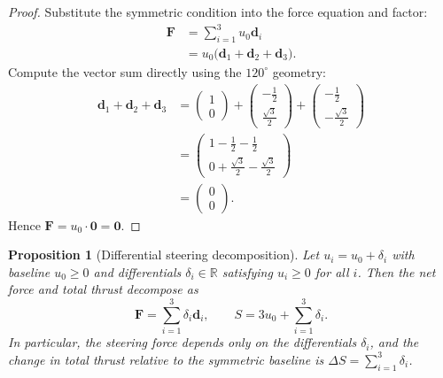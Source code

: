 \documentclass{article}
\newtheorem{proposition}{Proposition}
\begin{document}
\begin{proof}
Substitute the symmetric condition into the force equation and factor:
\[
\begin{aligned}
\mathbf F &= \sum_{i=1}^{3} u_0 \mathbf d_i \\
          &= u_0 \bigl(\mathbf d_1 + \mathbf d_2 + \mathbf d_3\bigr).
\end{aligned}
\]
Compute the vector sum directly using the $120^\circ$ geometry:
\[
\begin{aligned}
\mathbf d_1 + \mathbf d_2 + \mathbf d_3
&= \begin{pmatrix}1\\0\end{pmatrix}
+ \begin{pmatrix}-\tfrac{1}{2}\\ \tfrac{\sqrt{3}}{2}\end{pmatrix}
+ \begin{pmatrix}-\tfrac{1}{2}\\ -\tfrac{\sqrt{3}}{2}\end{pmatrix} \\[4pt]
&= \begin{pmatrix}1 - \tfrac{1}{2} - \tfrac{1}{2}\\ 0 + \tfrac{\sqrt{3}}{2} - \tfrac{\sqrt{3}}{2}\end{pmatrix} \\[4pt]
&= \begin{pmatrix}0\\0\end{pmatrix}.
\end{aligned}
\]
Hence $\mathbf F = u_0 \cdot \mathbf 0 = \mathbf 0$.
\end{proof}


\begin{proposition}[Differential steering decomposition]
\label{prop:differential_decomposition}
Let $u_i = u_0 + \delta_i$ with baseline $u_0 \ge 0$ and differentials $\delta_i \in \mathbb{R}$ 
satisfying $u_i \ge 0$ for all $i$. Then the net force and total thrust decompose as
\begin{equation}
\mathbf F = \sum_{i=1}^{3} \delta_i \mathbf d_i,
\qquad
S = 3u_0 + \sum_{i=1}^{3} \delta_i.
\end{equation}
In particular, the steering force depends only on the differentials $\delta_i$, and the change 
in total thrust relative to the symmetric baseline is $\Delta S = \sum_{i=1}^{3} \delta_i$.
\end{proposition}
\end{document}
